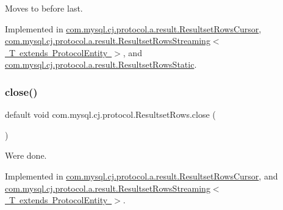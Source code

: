 Moves to before last. 

Implemented in \mbox{\hyperlink{classcom_1_1mysql_1_1cj_1_1protocol_1_1a_1_1result_1_1_resultset_rows_cursor_ad9ecb4a99d00c5fc3c2ada068b3d78e3}{com.\+mysql.\+cj.\+protocol.\+a.\+result.\+Resultset\+Rows\+Cursor}}, \mbox{\hyperlink{classcom_1_1mysql_1_1cj_1_1protocol_1_1a_1_1result_1_1_resultset_rows_streaming_a11ccbda4e0c40207c02253c5a2931748}{com.\+mysql.\+cj.\+protocol.\+a.\+result.\+Resultset\+Rows\+Streaming$<$ T extends Protocol\+Entity $>$}}, and \mbox{\hyperlink{classcom_1_1mysql_1_1cj_1_1protocol_1_1a_1_1result_1_1_resultset_rows_static_ae4eeeb6d930a55f44a5c80338115ef96}{com.\+mysql.\+cj.\+protocol.\+a.\+result.\+Resultset\+Rows\+Static}}.

\mbox{\label{interfacecom_1_1mysql_1_1cj_1_1protocol_1_1_resultset_rows_aae10da1813382e04a356d4e282d1a7f9}} 
\subsubsection{\texorpdfstring{close()}{close()}}
{\footnotesize\ttfamily default void com.\+mysql.\+cj.\+protocol.\+Resultset\+Rows.\+close (\begin{DoxyParamCaption}{ }\end{DoxyParamCaption})}

We\textquotesingle{}re done. 

Implemented in \mbox{\hyperlink{classcom_1_1mysql_1_1cj_1_1protocol_1_1a_1_1result_1_1_resultset_rows_cursor_a51a20849a2912a6869f24911f3334f76}{com.\+mysql.\+cj.\+protocol.\+a.\+result.\+Resultset\+Rows\+Cursor}}, and \mbox{\hyperlink{classcom_1_1mysql_1_1cj_1_1protocol_1_1a_1_1result_1_1_resultset_rows_streaming_ae16b87b06548b980f3b0e3d9df020296}{com.\+mysql.\+cj.\+protocol.\+a.\+result.\+Resultset\+Rows\+Streaming$<$ T extends Protocol\+Entity $>$}}.

\mbox{\label{interfacecom_1_1mysql_1_1cj_1_1protocol_1_1_resultset_rows_a8c98725ac82f59abb6eb000489624ce6}} 
